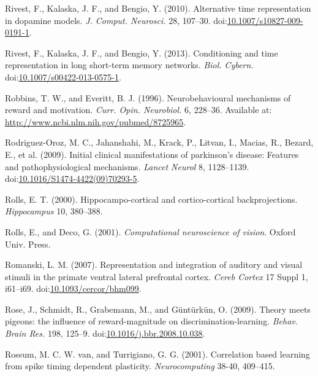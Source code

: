 \documentclass[
  11pt,
  a4paper,
]{scrbook}
\newlength{\cslhangindent}
\newenvironment{CSLReferences}[2] %
 {\begin{list}{}{%
  \setlength{\itemindent}{0pt}
  \setlength{\leftmargin}{0pt}
  \setlength{\parsep}{0pt}
  \ifodd #1
   \setlength{\leftmargin}{\cslhangindent}
   \setlength{\itemindent}{-1\cslhangindent}
  \fi
  \setlength{\itemsep}{#2\baselineskip}}}
 {\end{list}}
\begin{document}
\begin{CSLReferences}{1}{1}
Rivest, F., Kalaska, J. F., and Bengio, Y. (2010). {Alternative time
representation in dopamine models.} \emph{J. Comput. Neurosci.} 28,
107--30.
doi:\href{https://doi.org/10.1007/s10827-009-0191-1}{10.1007/s10827-009-0191-1}.

Rivest, F., Kalaska, J. F., and Bengio, Y. (2013). {Conditioning and
time representation in long short-term memory networks.} \emph{Biol.
Cybern.}
doi:\href{https://doi.org/10.1007/s00422-013-0575-1}{10.1007/s00422-013-0575-1}.

Robbins, T. W., and Everitt, B. J. (1996). {Neurobehavioural mechanisms
of reward and motivation.} \emph{Curr. Opin. Neurobiol.} 6, 228--36.
Available at: \url{http://www.ncbi.nlm.nih.gov/pubmed/8725965}.

Rodriguez-Oroz, M. C., Jahanshahi, M., Krack, P., Litvan, I., Macias,
R., Bezard, E., et al. (2009). Initial clinical manifestations of
parkinson's disease: Features and pathophysiological mechanisms.
\emph{Lancet Neurol} 8, 1128--1139.
doi:\href{https://doi.org/10.1016/S1474-4422(09)70293-5}{10.1016/S1474-4422(09)70293-5}.

Rolls, E. T. (2000). Hippocampo-cortical and cortico-cortical
backprojections. \emph{Hippocampus} 10, 380--388.

Rolls, E., and Deco, G. (2001). \emph{Computational neuroscience of
vision}. Oxford Univ. Press.

Romanski, L. M. (2007). Representation and integration of auditory and
visual stimuli in the primate ventral lateral prefrontal cortex.
\emph{Cereb Cortex} 17 Suppl 1, i61--i69.
doi:\href{https://doi.org/10.1093/cercor/bhm099}{10.1093/cercor/bhm099}.

Rose, J., Schmidt, R., Grabemann, M., and Güntürkün, O. (2009). {Theory
meets pigeons: the influence of reward-magnitude on
discrimination-learning.} \emph{Behav. Brain Res.} 198, 125--9.
doi:\href{https://doi.org/10.1016/j.bbr.2008.10.038}{10.1016/j.bbr.2008.10.038}.

Rossum, M. C. W. van, and Turrigiano, G. G. (2001). Correlation based
learning from spike timing dependent plasticity. \emph{Neurocomputing}
38-40, 409--415.


\end{CSLReferences}
\end{document}
